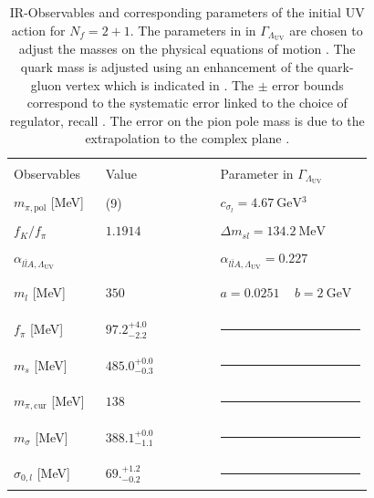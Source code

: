 \documentclass[aps,twocolumn,prd,superscriptaddress]{revtex4-2}
\begin{document}
\begin{table}[t]\centering
	\begin{tabular}{|>{\centering}m{0.24\linewidth} ||>{\centering}m{0.3\linewidth}|| >{\centering\arraybackslash}m{0.4\linewidth} |}
		\hline & & \\[-1ex]
		Observables & Value & Parameter in $\Gamma_{\Lambda_\textrm{UV}}$\\[1ex]
		\hline& & \\[-1ex]
		$m_{\pi,\textrm{pol}}$ [MeV]     &  138(9) & $c_{\sigma_l} = \qty{4.67}{\GeV^3}$  \\ [1ex]
		\hline & & \\[-1ex] 
		$f_K/f_\pi $   & $1.1914$    & 
		  $\Delta m_{sl} = \qty{134.2}{\MeV}$  \\[1ex]
		\hline & & \\[-1ex]
		$\alpha_{l\bar l A ,\Lambda_\textrm{UV}}$   &    & $  \alpha_{l\bar l A,\Lambda_\textrm{UV}} = 0.227$
		\\[1ex]
		\hline& &\\[-2ex]
		\hline & & \\[-1ex]
		$m_l$ [MeV]      &  $350$  &   $a= 0.0251 \,\quad b=\qty{2}{\GeV}$ \\[1ex]  
		\hline& &\\[-2ex]
		\hline & & \\[-1ex]
		$f_\pi$ [MeV]      &  $97.2^{+4.0}_{-2.2}$ & \noindent\rule{1cm}{0.4pt}
		\\[1ex]
		\hline& &\\[-1ex] 
		$m_s$ [MeV]      &  $485.0^{+0.0}_{-0.3}$  &  \noindent\rule{1cm}{0.4pt}
		\\[1ex]  
		\hline& &\\[-1ex] 
		$m_{\pi,\textrm{cur}}$ [MeV]      &  $138$ & \noindent\rule{1cm}{0.4pt}
		\\[1ex]
		\hline& &\\[-1ex] 
		$m_\sigma$ [MeV]      &$388.1^{+0.0}_{-1.1}$  & 
		\noindent\rule{1cm}{0.4pt} \\[1ex]  
		\hline& &\\[-1ex] 
		$\sigma_{0,l}$ [MeV]      & $69.^{+1.2}_{-0.2}$ & 
		\noindent\rule{1cm}{0.4pt} \\[1ex]  
		\hline
	\end{tabular}
	\caption{IR-Observables and corresponding parameters of the initial UV action for $N_f=2+1$. The parameters in in $\Gamma_{\Lambda_\textrm{UV}}$ are chosen to adjust the masses on the physical equations of motion . The quark mass is adjusted using an enhancement of the quark-gluon vertex which is indicated in . 
	The $\pm$ error bounds correspond to the systematic error linked to the choice of regulator, recall . The error on the pion pole mass is due to the extrapolation to the complex plane .
	\hspace*{\fill}	\label{tab:results} }
\end{table}
%
\end{document}
